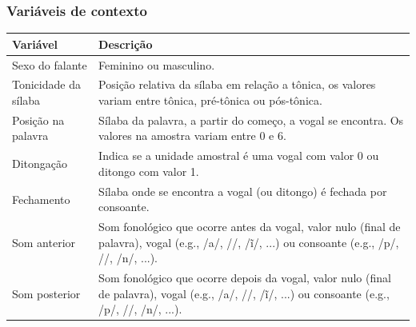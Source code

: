 \documentclass[121pt, aspectratio=169, t]{beamer}
\begin{document}
\begin{frame}[fragile=singleslide]
	\frametitle{Variáveis de contexto}
	\begin{table}[]
		\small
		\begin{tabular}{L{3.5cm}|L{11cm}}
			\toprule
			Variável             & Descrição \\ \midrule
			Sexo do falante      & Feminino ou masculino.\\
			Tonicidade da sílaba & Posição relativa da sílaba em relação a tônica, os valores variam entre tônica, pré-tônica ou pós-tônica. \\
			Posição na palavra   & Sílaba da palavra, a partir do começo, a vogal se encontra. Os valores na amostra variam entre 0 e 6. \\
			Ditongação           & Indica se a unidade amostral é uma vogal com valor 0 ou ditongo com valor 1. \\
			Fechamento           & Sílaba onde se encontra a vogal (ou ditongo) é fechada por consoante.  \\
			Som anterior         & Som fonológico que ocorre antes da vogal, valor nulo (final de palavra), vogal (e.g., /a/, /\textepsilon /, /ĩ/, ...) ou consoante (e.g., /p/, /\textteshlig/, /n/, ...). \\
			Som posterior        & Som fonológico que ocorre depois da vogal, valor nulo (final de palavra), vogal (e.g., /a/, /\textepsilon /, /ĩ/, ...) ou consoante (e.g., /p/, /\textteshlig/, /n/, ...). \\ \bottomrule
		\end{tabular}
	\end{table}
\end{frame}
\end{document}
